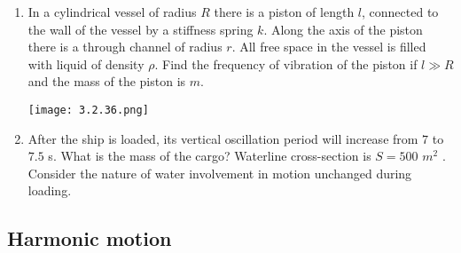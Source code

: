 \documentclass{article}
\begin{document}
\begin{enumerate}[label=3.2.\arabic*]
\item In a cylindrical vessel of radius $R$ there is a piston of length $l$, connected to the wall of the vessel by a stiffness spring $k$. Along the axis of the piston there is a through channel of radius $r$. All free space in the vessel is filled with liquid of density $\rho$. Find the frequency of vibration of the piston if $l \gg R$ and the mass of the piston is $m$.

\begin{center}
    \texttt{[image: 3.2.36.png]}
\end{center}

\item After the ship is loaded, its vertical oscillation period will increase from $7$ to $7.5$ s. What is the mass of the cargo? Waterline cross-section is $S = 500$ $m^2$ . Consider the nature of water involvement in motion unchanged during loading.

\end{enumerate}


\subsection{Harmonic motion}
\end{document}
